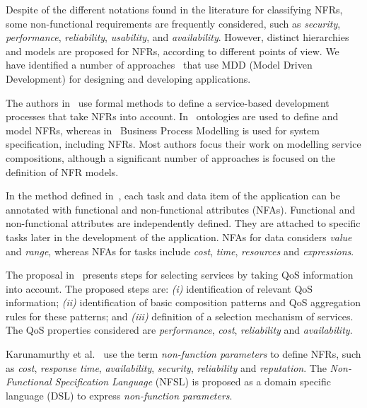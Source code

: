 Despite of the different notations found in the literature for classifying NFRs, some non-functional requirements are frequently considered, such as \textit{security}, \textit{performance}, \textit{reliability}, \textit{usability}, and \textit{availability}.
However, distinct hierarchies and models are proposed for NFRs,  according to different points of view.
We have identified a number of approaches~\cite{DAmbrogio06,CholletL09,SchmelingCM11,BasinDL06,Fabra2011,OvaskaEHPA10} that use MDD (Model Driven Development) for designing and developing applications. 

The authors in~\cite{ThissenW06,ZhangPSP05} use formal methods to define a service-based development processes that take NFRs into account. 
In~\cite{AgarwalLS09,PastranaPK11} ontologies are used to define and model NFRs, 
whereas in~\cite{XiaoCZBOLH08,GutierrezRF10} Business Process Modelling is used for
system specification, including NFRs. 
Most authors focus their work on modelling service compositions, although a significant number of approaches is focused on the definition of NFR models.

In the method defined in~\cite{XiaoCZBOLH08}, each task and data item of the application can be 
annotated with functional and non-functional attributes (NFAs). 
Functional and non-functional attributes are independently defined.
They are attached to specific tasks later in the development of the application. 
NFAs for data considers \textit{value} and \textit{range}, whereas NFAs for tasks include \textit{cost}, \textit{time}, \textit{resources} and \textit{expressions}.

The proposal in~\cite{ThissenW06} presents steps for  selecting services 
by taking QoS information into account. The proposed steps are: 
\textit{(i)} identification of relevant QoS information; 
\textit{(ii)} identification of basic composition patterns and 
QoS aggregation rules for these patterns; and 
\textit{(iii)} definition of a selection mechanism of services. 
The QoS properties considered are \textit{performance}, \textit{cost}, \textit{reliability} and
\textit{availability}. 
  
Karunamurthy et al.~\cite{Karunamurthy2012787} use the term \textit{non-function parameters} to define NFRs, such as \textit{cost}, \textit{response time}, \textit{availability}, \textit{security}, \textit{reliability} and \textit{reputation}.  
The \textit{Non-Func\-tion\-al Specification Language} (NFSL) is proposed as a domain specific language (DSL) to express \textit{non-function parameters}.

